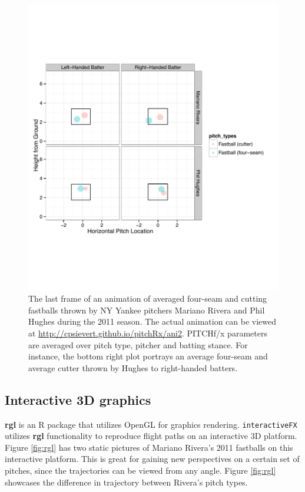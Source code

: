\documentclass[12pt,]{isuthesis}
\begin{document}
\begin{figure}[htbp]
\centering
\includegraphics{images/ani-frame2.pdf}
\caption{\label{fig:animate2}The last frame of an animation of averaged
four-seam and cutting fastballs thrown by NY Yankee pitchers Mariano
Rivera and Phil Hughes during the 2011 season. The actual animation can
be viewed at \url{http://cpsievert.github.io/pitchRx/ani2}. PITCHf/x
parameters are averaged over pitch type, pitcher and batting stance. For
instance, the bottom right plot portrays an average four-seam and
average cutter thrown by Hughes to right-handed batters.}
\end{figure}

\subsection{Interactive 3D graphics}\label{interactive-3d-graphics}

\textbf{rgl} is an R package that utilizes OpenGL for graphics
rendering. \texttt{interactiveFX} utilizes \textbf{rgl} functionality to
reproduce flight paths on an interactive 3D platform. Figure
\ref{fig:rgl} has two static pictures of Mariano Rivera's 2011 fastballs
on this interactive platform. This is great for gaining new perspectives
on a certain set of pitches, since the trajectories can be viewed from
any angle. Figure \ref{fig:rgl} showcases the difference in trajectory
between Rivera's pitch types.
\end{document}
